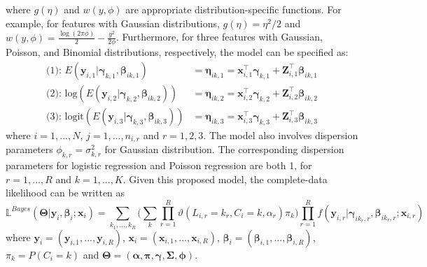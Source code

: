 where $g(\eta)$ and $w(y,\phi)$ are appropriate distribution-specific functions. For example, for features with Gaussian distributions, $g(\eta) = \eta^2/2$ and $w(y,\phi) = \frac{\log(2\pi\phi)}{2} - \frac{y^2}{2\phi}$. Furthermore, for three features with Gaussian, Poisson, and Binomial distributions, respectively, the model can be specified as: 
\begin{align*}
  \text{(1): }  E(\boldsymbol{y}_{i,1}|\boldsymbol{\gamma}_{k,1}, \boldsymbol{\beta}_{ik,1}) & = \boldsymbol{\eta}_{ik,1}  =   \boldsymbol{x}_{i,1}^\top\boldsymbol{\gamma}_{k,1} +  \boldsymbol{Z}_{i,1}^\top\boldsymbol{\beta}_{ik,1}  \\
  \text{(2): }    \text{log}(E(\boldsymbol{y}_{i,2}|\boldsymbol{\gamma}_{k,2}, \boldsymbol{\beta}_{ik,2})) & = \boldsymbol{\eta}_{ik,2}  =  \boldsymbol{x}_{i,2}^\top\boldsymbol{\gamma}_{k,2} +  \boldsymbol{Z}_{i,2}^\top\boldsymbol{\beta}_{ik,2} \\
  \text{(3): }   \text{logit}(E(\boldsymbol{y}_{i,3}|\boldsymbol{\gamma}_{k,3},\boldsymbol{\beta}_{ik,3})) & =  \boldsymbol{\eta}_{ik,3} = \boldsymbol{x}_{i,3}^\top\boldsymbol{\gamma}_{k,3} +  \boldsymbol{Z}_{i,3}^\top\boldsymbol{\beta}_{ik,3}
\end{align*}
where $i=1,...,N$, $j=1,...,n_{i,r}$ and $r=1,2,3$. The model also involves dispersion parameters $\phi_{k,r} = \sigma^2_{k,r}$ for Gaussian distribution. The corresponding dispersion parameters for logistic regression and Poisson regression are both 1, for $r=1,...,R$ and $k=1,...,K$. Given this proposed model, the complete-data likelihood can be written as
\begin{equation}
 \mathbb{L}^{Bayes}(\boldsymbol{\Theta}| \boldsymbol{y}_i,\boldsymbol{\beta}_i; \boldsymbol{x}_{i})   =  \sum_{k_1,...,k_R}   \bigg(\sum_k \prod_{r=1}^R \vartheta(L_{i,r}=k_r,C_i=k,\alpha_r) \pi_k \bigg)  \prod_{r=1}^R f(\boldsymbol{y}_{i,r}|\boldsymbol{\gamma}_{ik_r,r},\boldsymbol{\beta}_{ik_r,r}; \boldsymbol{x}_{i,r}) 
\end{equation}
where $\boldsymbol{y}_i = (\boldsymbol{y}_{i,1},...,\boldsymbol{y}_{i,R})$, $\boldsymbol{x}_i = (\boldsymbol{x}_{i,1},...,\boldsymbol{x}_{i,R})$, $\boldsymbol{\beta}_i = (\boldsymbol{\beta}_{i,1},..., \boldsymbol{\beta}_{i,R})$, $\pi_k=P(C_i = k)$ and $\boldsymbol{\Theta}= (\boldsymbol{\alpha}, \boldsymbol{\pi},\boldsymbol{\gamma},\boldsymbol{\Sigma},\boldsymbol{\phi})$.


